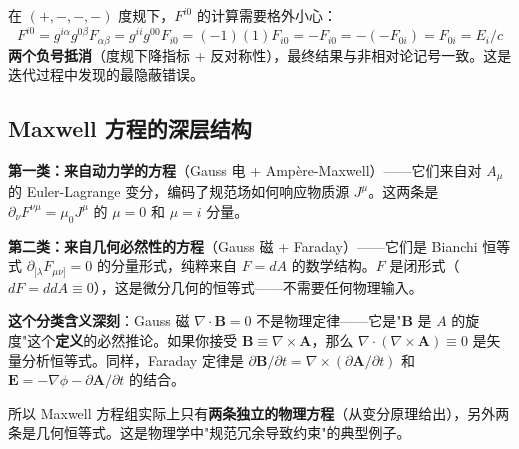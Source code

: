 在 $(+,-,-,-)$ 度规下，$F^{i0}$ 的计算需要格外小心：
\[
F^{i0} = g^{i\alpha}g^{0\beta}F_{\alpha\beta} = g^{ii}g^{00}F_{i0} = (-1)(1)F_{i0} = -F_{i0} = -(-F_{0i}) = F_{0i} = E_i/c
\]
\textbf{两个负号抵消}（度规下降指标 + 反对称性），最终结果与非相对论记号一致。这是迭代过程中发现的最隐蔽错误。

\subsection{Maxwell 方程的深层结构}


\textbf{第一类：来自动力学的方程}（Gauss 电 + Amp\`{e}re-Maxwell）——它们来自对 $A_\mu$ 的 Euler-Lagrange 变分，编码了规范场如何响应物质源 $J^\mu$。这两条是$\partial_\nu F^{\nu\mu} = \mu_0 J^\mu$ 的 $\mu=0$ 和 $\mu=i$ 分量。

\textbf{第二类：来自几何必然性的方程}（Gauss 磁 + Faraday）——它们是 Bianchi 恒等式 $\partial_{[\lambda}F_{\mu\nu]}=0$ 的分量形式，纯粹来自 $F = dA$ 的数学结构。$F$ 是闭形式（$dF = ddA \equiv 0$），这是微分几何的恒等式——不需要任何物理输入。

\textbf{这个分类含义深刻}：Gauss 磁 $\nabla\cdot\mathbf{B}=0$ 不是物理定律——它是"$\mathbf{B}$ 是 $A$ 的旋度"这个\textbf{定义}的必然推论。如果你接受 $\mathbf{B} \equiv \nabla\times\mathbf{A}$，那么 $\nabla\cdot(\nabla\times\mathbf{A}) \equiv 0$ 是矢量分析恒等式。同样，Faraday 定律是 $\partial\mathbf{B}/\partial t = \nabla\times(\partial\mathbf{A}/\partial t)$ 和 $\mathbf{E} = -\nabla\phi - \partial\mathbf{A}/\partial t$ 的结合。

所以 Maxwell 方程组实际上只有\textbf{两条独立的物理方程}（从变分原理给出），另外两条是几何恒等式。这是物理学中"规范冗余导致约束"的典型例子。


